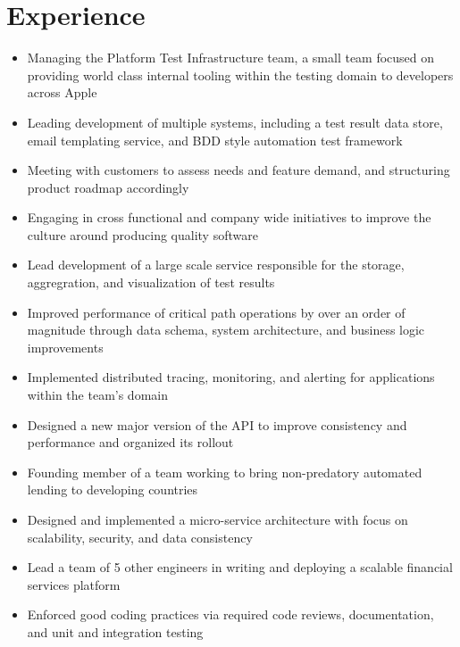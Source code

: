 \documentclass[11pt,letterpaper,sans]{moderncv}        %
\begin{document}
\makecvtitle

\vspace{-10mm}

\section{Experience}

\begin{itemize}
\item Managing the Platform Test Infrastructure team, a small team focused on providing world class internal tooling within the testing domain to developers across Apple
\item Leading development of multiple systems, including a test result data store, email templating service, and BDD style automation test framework
\item Meeting with customers to assess needs and feature demand, and structuring product roadmap accordingly
\item Engaging in cross functional and company wide initiatives to improve the culture around producing quality software
\end{itemize}

\begin{itemize}
\item Lead development of a large scale service responsible for the storage, aggregration, and visualization of test results
\item Improved performance of critical path operations by over an order of magnitude through data schema, system architecture, and business logic improvements
\item Implemented distributed tracing, monitoring, and alerting for applications within the team's domain
\item Designed a new major version of the API to improve consistency and performance and organized its rollout
\end{itemize}

\begin{itemize}
\item Founding member of a team working to bring non-predatory automated lending to developing countries
\item Designed and implemented a micro-service architecture with focus on scalability, security, and data consistency
\item Lead a team of 5 other engineers in writing and deploying a scalable financial services platform
\item Enforced good coding practices via required code reviews, documentation, and unit and integration testing
\end{itemize}
\end{document}
